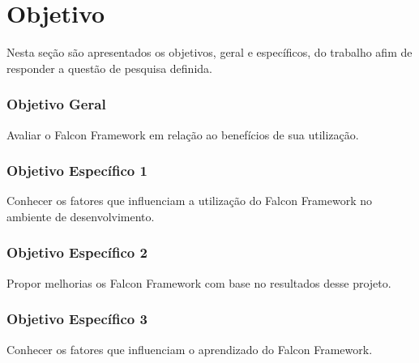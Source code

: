 \chapter{Objetivo}\label{cap2}

Nesta seção são apresentados os objetivos, geral e específicos, do trabalho afim de responder a questão de pesquisa definida.

\subsection{Objetivo Geral}

Avaliar o Falcon Framework em relação ao benefícios de sua utilização.

\subsection{Objetivo Específico 1}

Conhecer os fatores que influenciam a utilização do Falcon Framework no ambiente de desenvolvimento.

\subsection{Objetivo Específico 2}

Propor melhorias os Falcon Framework com base no resultados desse projeto.

\subsection{Objetivo Específico 3}

Conhecer os fatores que influenciam o aprendizado do Falcon Framework.
